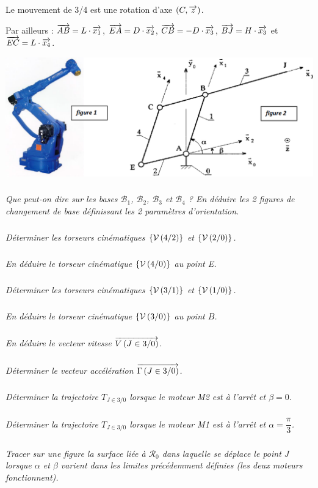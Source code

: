 \documentclass[10pt]{article}
\begin{document}
Le mouvement de 3/4 est une rotation d'axe $(C,\overrightarrow{z})$.

Par ailleurs : $\overrightarrow{AB} = L\cdot \overrightarrow{x_1}$, 
$\overrightarrow{EA} = D\cdot \overrightarrow{x_2}$,
$\overrightarrow{CB}= - D\cdot \overrightarrow{x_3}$,
$\overrightarrow{BJ} = H\cdot \overrightarrow{x_3}$ et 
$\overrightarrow{EC} = L \cdot \overrightarrow{x_4}$.

\begin{center}
\includegraphics[width=.9\textwidth]{images/fig2}
\end{center}

\subparagraph{}
\textit{Que peut-on dire sur les bases $\mathcal{B}_1$, $\mathcal{B}_2$, $\mathcal{B}_3$ et $\mathcal{B}_4$ ? En déduire les 2 figures de changement de base définissant les 2 paramètres d’orientation.}

\subparagraph{}
\textit{Déterminer les torseurs cinématiques $\left\{\mathcal{V} \left(4/2 \right) \right\}$ et $\left\{\mathcal{V} \left(2/0 \right) \right\}$.}

\subparagraph{}
\textit{En déduire le torseur cinématique $\left\{\mathcal{V} \left(4/0 \right) \right\}$ au point E.}

\subparagraph{}
\textit{Déterminer les torseurs cinématiques $\left\{\mathcal{V} \left(3/1 \right) \right\}$ et $\left\{\mathcal{V} \left(1/0 \right) \right\}$.}

\subparagraph{}
\textit{En déduire le torseur cinématique $\left\{\mathcal{V} \left(3/0 \right) \right\}$ au point $B$.}

\subparagraph{}
\textit{En déduire le vecteur vitesse $\overrightarrow{V\left( {J} \in {3}/{0}\right)}$.}

\subparagraph{}
\textit{Déterminer le vecteur accélération $\overrightarrow{\Gamma \left( {J} \in {3}/{0}\right)}$.}

\subparagraph{}
\textit{Déterminer la trajectoire $T_{J\in3/0}$ lorsque le moteur M2 est à l’arrêt et $\beta=0$.}

\subparagraph{}
\textit{Déterminer la trajectoire $T_{J\in3/0}$ lorsque le moteur M1 est à l’arrêt et $\alpha=\dfrac{\pi}{3}$.}

\subparagraph{}
\textit{Tracer sur une figure la surface liée à $\mathcal{R}_0$ dans laquelle se déplace le point $J$ lorsque $\alpha$ et $\beta$ varient dans les
limites précédemment définies (les deux moteurs fonctionnent).}
\end{document}
